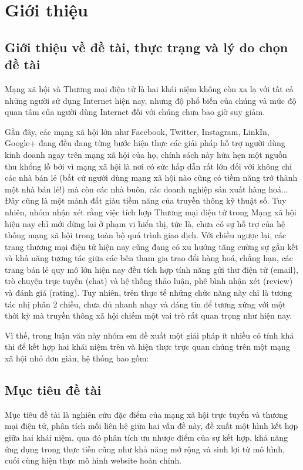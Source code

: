 \chapter{Giới thiệu}
\section{Giới thiệu về đề tài, thực trạng và lý do chọn đề tài}
Mạng xã hội và Thương mại điện tử là hai khái niệm không còn xa lạ với tất cả những người sử dụng Internet hiện nay, nhưng độ phổ biến của chúng và mức độ quan tâm của người dùng Internet đối với chúng chưa bao giờ suy giảm. 

Gần đây, các mạng xã hội lớn như Facebook, Twitter, Instagram, LinkIn, Google+ đang đều đang từng bước hiện thực các giải pháp hỗ trợ người dùng kinh doanh ngay trên mạng xã hội của họ, chính sách này hứa hẹn một nguồn thu khổng lồ bởi vì mạng xã hội là nơi có sức hấp dẫn rất lớn đối với không chỉ các nhà bán lẻ (bất cứ người dùng mạng xã hội nào cũng có tiềm năng trở thành một nhà bán lẻ!) mà còn các nhà buôn, các doanh nghiệp sản xuất hàng hoá... Đây cũng là một mảnh đất giàu tiềm năng của truyền thông kỹ thuật số. Tuy nhiên, nhóm nhận xét rằng việc tích hợp Thương mại điện tử trong Mạng xã hội hiện nay chỉ mới dừng lại ở phạm vi hiển thị, tức là, chưa có sự hỗ trợ của hệ thống mạng xã hội trong toàn bộ quá trình giao dịch. 
Với chiều ngược lại, các trang thương mại điện tử hiện nay cũng đang có xu hướng tăng cường sự gắn kết và khả năng tương tác giữa các bên tham gia trao đổi hàng hoá, chẳng hạn, các trang bán lẻ quy mô lớn hiện nay đều tích hợp tính năng gửi thư điện tử (email), trò chuyện trực tuyến (chat) và hệ thống thảo luận, phê bình nhận xét (review) và đánh giá (rating). Tuy nhiên, trên thực tế những chức năng này chỉ là tương tác nhị phân 2 chiều, chưa đủ nhanh nhạy và đáng tin để tương xứng với một thời kỳ mà truyền thông xã hội chiếm một vai trò rất quan trọng như hiện nay.

Vì thế, trong luận văn này nhóm em đề xuất một giải pháp ít nhiều có tính khả thi để kết hợp hai khái niệm trên và hiện thực trực quan chúng trên một mạng xã hội nhỏ đơn giản, hệ thống bao gồm:

\section{Mục tiêu đề tài}
Mục tiêu đề tài là nghiên cứu đặc điểm của mạng xã hội trực tuyến và thương mại điện tử, phân tích mối liên hệ giữa hai vấn đề này, đề xuất một hình kết hợp giữa hai khái niệm, qua đó phân tích ưu nhược điểm của sự kết hợp, khả năng ứng dụng trong thực tiễn cũng như khả năng mở rộng và sinh lợi từ mô hình, cuối cùng hiện thực mô hình website hoàn chỉnh.

